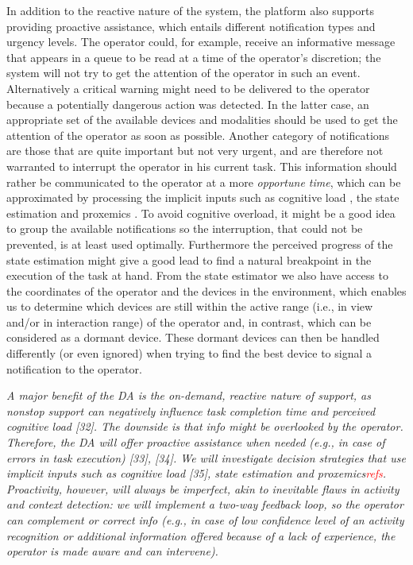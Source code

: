 In addition to the reactive nature of the system, the platform also supports providing proactive assistance, which entails different notification types and urgency levels. 
The operator could, for example, receive an informative message that appears in a queue to be read at a time of the operator's discretion; the system will not try to get the attention of the operator in such an event. 
Alternatively a critical warning might need to be delivered to the operator because a potentially dangerous action was detected. In the latter case, an appropriate set of the available devices and modalities should be used to get the attention of the operator as soon as possible.
Another category of notifications are those that are quite important but not very urgent, and are therefore not warranted to interrupt the operator in his current task. This information should rather be communicated to the operator at a more \textit{opportune time}, which can be approximated by processing the implicit inputs such as cognitive load \cite{lindlbauer2019ContextAwareOnlineAdaptation}, the state estimation and proxemics \cite{Marquardt_2015} \cite{Williamson_2022}. 
To avoid cognitive overload, it might be a good idea to group the available notifications so the interruption, that could not be prevented, is at least used optimally.
Furthermore the perceived progress of the state estimation might give a good lead to find a natural breakpoint in the execution of the task at hand.
From the state estimator we also have access to the coordinates of the operator and the devices in the environment, which enables us to determine which devices are still within the active range (i.e., in view and/or in interaction range) of the operator and, in contrast, which can be considered as a dormant device. These dormant devices can then be handled differently (or even ignored) when trying to find the best device to signal a notification to the operator.

\iffalse
\textit{A major benefit of the DA is the on-demand, reactive nature of support, as nonstop support can negatively influence task completion time and perceived cognitive load [32]. The downside is that info might be overlooked by the operator. Therefore, the DA will offer proactive assistance when needed (e.g., in case of errors in task execution) [33], [34]. We will investigate decision strategies that use implicit inputs such as cognitive load [35], state estimation and proxemics\textcolor{red}{refs}. 
Proactivity, however, will always be imperfect, akin to inevitable flaws in activity and context detection: we will implement a two-way feedback loop, so the operator can complement or correct info (e.g., in case of low confidence level of an activity recognition or additional information offered because of a lack of experience, the operator is made aware and can intervene). }

